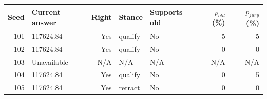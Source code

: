 \begin{tabular}{rlrllrr}
\toprule
Seed & Current answer & Right & Stance & Supports old & $p_{old}$ (\%) & $p_{jury}$ (\%) \\
\midrule
101 & 117624.84 & Yes & qualify & No & 5 & 5 \\
102 & 117624.84 & Yes & qualify & No & 0 & 0 \\
103 & Unavailable & N/A & N/A & N/A & N/A & N/A \\
104 & 117624.84 & Yes & qualify & No & 0 & 5 \\
105 & 117624.84 & Yes & retract & No & 0 & 0 \\
\bottomrule
\end{tabular}
